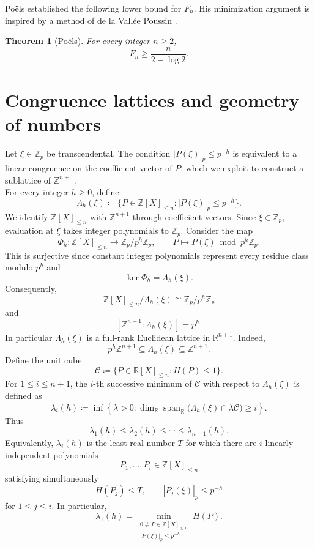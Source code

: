 \documentclass[12pt,reqno]{amsart}
\newtheorem{theorem}{Theorem}[section]
\theoremstyle{definition}
\theoremstyle{remark}
\newcommand{\Z}{\mathbb Z}
\newcommand{\R}{\mathbb R}
\newcommand{\Zp}{\mathbb Z_p}
\newcommand{\Span}{\operatorname{span}}
\begin{document}
Po\"els \cite[Theorem~8.1]{PoelsWirsing} established the following lower
bound for $F_n$. His minimization argument is inspired by a method of de la
Vall\'ee Poussin \cite[Chapter~VI]{ValleePoussin}.
\begin{theorem}[Po\"els]\label{thm:optimization}
For every integer $n\geq2$,
$$
F_n\geq\frac{n}{2-\log 2}.
$$
\end{theorem}

\bigskip

\section{\bf Congruence lattices and geometry of numbers}
\bigskip


Let $\xi\in\Zp$ be transcendental. The condition
$|P(\xi)|_p\leq p^{-h}$ is equivalent to a linear congruence on the
coefficient vector of $P$, which we exploit to construct a sublattice of $\Z^{n+1}$.\\ 

For every integer $h\geq0$, define
$$
\Lambda_h(\xi)
\coloneqq
\{P\in\Z[X]_{\leq n}:|P(\xi)|_p\leq p^{-h}\}.
$$
We identify $\Z[X]_{\leq n}$ with $\Z^{n+1}$ through coefficient vectors. Since $\xi\in\Zp$, evaluation at $\xi$ takes integer polynomials to $\Zp$. Consider the map 
$$
\Phi_h:\Z[X]_{\leq n}\longrightarrow\Zp/p^h\Zp,
\qquad
P\longmapsto P(\xi)\bmod p^h\Zp.
$$
This is surjective since constant integer polynomials represent every residue class modulo $p^h$ and
$$
\ker\Phi_h=\Lambda_h(\xi).
$$
Consequently,
$$
\Z[X]_{\leq n}/\Lambda_h(\xi)
\cong
\Zp/p^h\Zp
$$
and
$$
[\Z^{n+1}:\Lambda_h(\xi)]=p^h.
$$
In particular $\Lambda_h(\xi)$ is a full-rank Euclidean lattice in $\R^{n+1}$. Indeed,
$$
p^h\Z^{n+1}\subseteq\Lambda_h(\xi)\subseteq\Z^{n+1}.
$$
Define the unit cube
$$
\mathcal C
\coloneqq
\{P\in\R[X]_{\leq n}:H(P)\leq 1\}.
$$
For $1\leq i\leq n+1$, the $i$-th successive minimum of $\mathcal C$ with respect to $\Lambda_h(\xi)$ is defined as
$$
\lambda_i(h)
\coloneqq
\inf\left\{
\lambda>0:
\dim_{\R}\Span_{\R}\bigl(\Lambda_h(\xi)\cap\lambda\mathcal C\bigr)\geq i
\right\}.
$$
Thus
$$
\lambda_1(h)\leq\lambda_2(h)\leq\cdots\leq\lambda_{n+1}(h).
$$
Equivalently, $\lambda_i(h)$ is the least real number $T$ for which there are $i$ linearly independent polynomials
$$
P_1,\ldots,P_i\in\Z[X]_{\leq n}
$$
satisfying simultaneously
$$
H(P_j)\leq T,
\qquad
|P_j(\xi)|_p\leq p^{-h}
$$
for $1\leq j\leq i$. In particular,
$$
\lambda_1(h)
=
\min_{\substack{0\neq P\in\Z[X]_{\leq n}\\ |P(\xi)|_p\leq p^{-h}}}H(P).
$$
\end{document}
